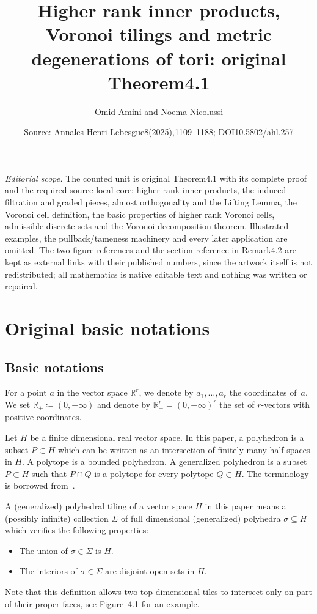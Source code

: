 \documentclass[10pt,a4paper]{amsart}
\title[Almost orthogonal decomposition of Voronoi closures]{Higher rank inner products, Voronoi tilings and metric degenerations of tori: original Theorem4.1}
\author{Omid Amini and Noema Nicolussi}
\date{Source: Annales Henri Lebesgue8(2025),1109--1188; DOI10.5802/ahl.257}
\newcommand{\R}{\mathbb{R}}
\theoremstyle{definition}\newtheorem{defi}[cdrthm]{Definition}
\begin{document}
\maketitle
\noindent\textit{Editorial scope.} The counted unit is original Theorem4.1 with its complete proof and the required source-local core: higher rank inner products, the induced filtration and graded pieces, almost orthogonality and the Lifting Lemma, the Voronoi cell definition, the basic properties of higher rank Voronoi cells, admissible discrete sets and the Voronoi decomposition theorem. Illustrated examples, the pullback/tameness machinery and every later application are omitted. The two figure references and the section reference in Remark4.2 are kept as external links with their published numbers, since the artwork itself is not redistributed; all mathematics is native editable text and nothing was written or repaired.
\section{Original basic notations}
\subsection*{Basic notations} \label{ss:BasicNotations}
For a point $a$ in the vector space $\R^r$, we denote by $a_1, \dots, a_r$ the coordinates of~$a$. We set $\R_+ \coloneqq (0, +\infty)$ and denote by $\R_+^r =(0,+\infty)^r$ the set of $r$-vectors with positive coordinates.

Let $H$ be a finite dimensional real vector space. In this paper, a polyhedron is a subset $P \subset H$ which can be written as an intersection of finitely many half-spaces in $H$. A polytope is a bounded polyhedron. A generalized polyhedron is a subset $P \subset H$ such that $P \cap Q$ is a polytope for every polytope $Q \subset H$. The terminology is borrowed from~\cite[p.~250]{Gruber}.


A (generalized) polyhedral tiling of a vector space $H$ in this paper means a (possibly infinite) collection $\Sigma$ of full dimensional (generalized) polyhedra $\sigma \subseteq H$ which verifies the following properties:
\begin{itemize}
\item The union of $\sigma \in \Sigma$ is $H$.
\item The interiors of $\sigma \in \Sigma$ are disjoint open sets in $H$.
\end{itemize}

Note that this definition allows two top-dimensional tiles to intersect only on part of their proper faces, see Figure~\href{https://ahl.centre-mersenne.org/articles/10.5802/ahl.257/}{4.1} for an example.
\end{document}
